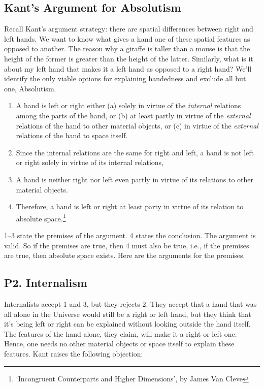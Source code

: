 \documentclass[oneside]{article}
\begin{document}
\thispagestyle{fancy}



\subsection*{Kant's Argument for Absolutism}\label{master-argument}

Recall Kant's argument strategy: there are spatial differences between right and
left hands. We want to know what gives a hand one of these spatial
features as opposed to another. The reason why a giraffe is taller than
a mouse is that the height of the former is greater than the height of
the latter. Similarly, what is it about my left hand that makes it a
left hand as opposed to a right hand? We'll identify the only viable
options for explaining handedness and exclude all but one, Absolutism.

\begin{enumerate}

\item
  A hand is left or right either (a) solely in virtue of the
  \emph{internal} relations among the parts of the hand, or (b) at least
  partly in virtue of the \emph{external} relations of the hand to other
  material objects, or (c) in virtue of the \emph{external} relations of
  the hand to space itself.
\item
  Since the internal relations are the same for right and left, a hand
  is not left or right solely in virtue of its internal relations,
\item
  A hand is neither right nor left even partly in virtue of its
  relations to other material objects.
\item
  Therefore, a hand is left or right at least party in virtue of its
  relation to absolute space.\footnote{`Incongruent Counterparts and
    Higher Dimensions', by James Van Cleve}
\end{enumerate}
1--3 state the premises of the argument. 4 states the conclusion. The
argument is valid. So if the premises are true, then 4 must also be true, i.e., if the premises are true, then absolute space exists. Here are the
arguments for the premises.

\subsection*{P2. Internalism}\label{p2.-internalism}

Internalists accept 1 and 3, but they rejects 2. They accept that a hand
that was all alone in the Universe would still be a right or left hand,
but they think that it's being left or right can be explained without
looking outside the hand itself. The features of the hand alone, they
claim, will make it a right or left one. Hence, one needs no other
material objects or space itself to explain these features. Kant raises the following objection:
\end{document}
